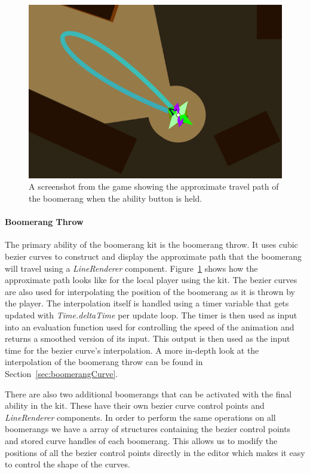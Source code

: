 \begin{figure}[tbph]  %
  \centering
  \includegraphics[width=.75\textwidth]{images/boomerangKitLineRenderer}
  \caption[Approximate travel path of the boomerang]{A screenshot from the game showing the approximate travel path of the boomerang when the ability button is held.}
  \label{fig:boomerangLineRenderer}
\end{figure}

\paragraph{Boomerang Throw}
The primary ability of the boomerang kit is the boomerang throw. It uses cubic bezier curves to construct and display the approximate path that the boomerang will travel using a \emph{LineRenderer} component. Figure~\ref{fig:boomerangLineRenderer} shows how the approximate path looks like for the local player using the kit. 
The bezier curves are also used for interpolating the position of the boomerang as it is thrown by the player. The interpolation itself is handled using a timer variable that gets updated with \emph{Time.deltaTime} per update loop. The timer is then used as input into an evaluation function used for controlling the speed of the animation and returns a smoothed version of its input. This output is then used as the input time for the bezier curve's interpolation. A more in-depth look at the interpolation of the boomerang throw can be found in Section~\ref{sec:boomerangCurve}. 
    
There are also two additional boomerangs that can be activated with the final ability in the kit. These have their own bezier curve control points and \emph{LineRenderer} components.
In order to perform the same operations on all boomerangs we have a array of structures containing the bezier control points and stored curve handles of each boomerang. This allows us to modify the positions of all the bezier control points directly in the editor which makes it easy to control the shape of the curves.  

